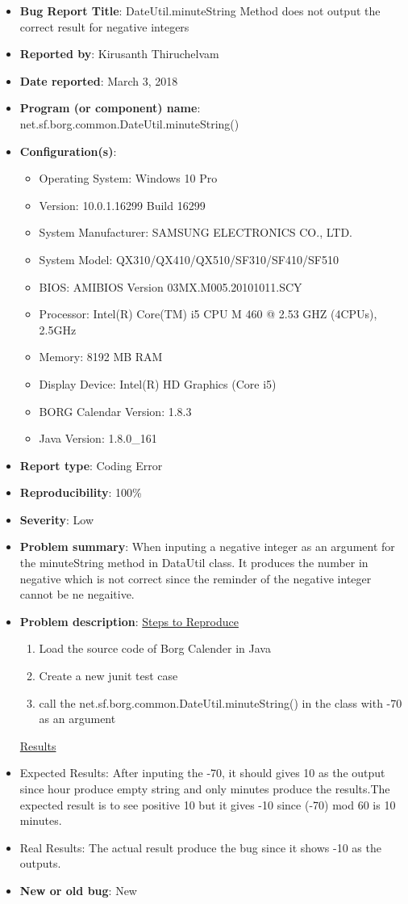 \documentclass[fontsize=12pt,paper=letter,twoside]{scrartcl}
\begin{document}
\begin{itemize}
\begin{itemize}
\item \textbf{Bug Report Title}: DateUtil.minuteString Method does not output the correct result for negative integers
\item \textbf{Reported by}: Kirusanth Thiruchelvam
\item \textbf{Date reported}: March 3, 2018
\item \textbf{Program (or component) name}: net.sf.borg.common.DateUtil.minuteString()
\item \textbf{Configuration(s)}:
\begin{itemize}
\item Operating System: Windows 10 Pro 
\item Version: 10.0.1.16299 Build 16299
\item System Manufacturer: SAMSUNG ELECTRONICS CO., LTD.
\item System Model: QX310/QX410/QX510/SF310/SF410/SF510
\item BIOS: AMIBIOS Version 03MX.M005.20101011.SCY 
\item Processor: Intel(R) Core(TM) i5 CPU   M 460   @ 2.53 GHZ (4CPUs), ~ 2.5GHz
\item Memory: 8192 MB RAM
\item Display Device: Intel(R) HD Graphics (Core i5)
\item BORG Calendar Version: 1.8.3
\item Java Version: 1.8.0\_161
\end{itemize}
\item \textbf{Report type}: Coding Error
\item \textbf{Reproducibility}: 100\%
\item \textbf{Severity}: Low
\item \textbf{Problem summary}: When inputing a negative integer as an argument for the minuteString method in DataUtil class. It produces the number in negative which is not correct since the reminder of the negative integer cannot be ne negaitive.
\item \textbf{Problem description}:\newline
\underline{Steps to Reproduce}
\begin{enumerate}
\item Load the source code of Borg Calender in Java
 \item Create a new junit test case
 \item call the net.sf.borg.common.DateUtil.minuteString() in the class with -70 as an argument
\end {enumerate}
 \underline{ Results}
\item Expected Results: After inputing the -70, it should gives 10 as the output since hour produce empty string and only minutes produce the results.The expected result is to see positive 10 but it gives -10 since (-70) mod 60 is 10 minutes.
\item Real Results: The actual result produce the bug since it shows -10 as the outputs.
\item \textbf{New or old bug}: New
\end{itemize}



\end{itemize}
\end{document}
